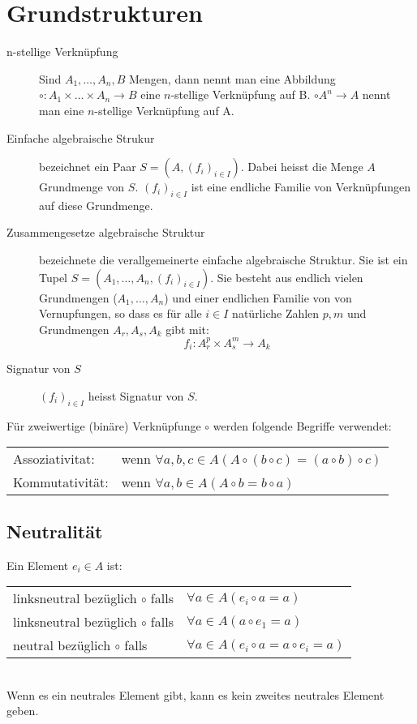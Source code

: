 \section{Grundstrukturen}
\begin{description}
	\item [n-stellige Verknüpfung]
	Sind $A_1, \dots, A_n, B$ Mengen, dann nennt man eine Abbildung $\circ : A_1 \times \dots \times A_n \rightarrow B$
	eine $n$-stellige Verknüpfung auf B. $\circ A^n \rightarrow A$ nennt man eine $n$-stellige Verknüpfung auf A. 
	
	\item[Einfache algebraische Strukur] bezeichnet ein Paar $S = (A, (f_i)_{i \in I})$. Dabei heisst die Menge $A$ Grundmenge von $S$. $(f_i)_{i \in I}$ ist eine endliche Familie von Verknüpfungen auf diese Grundmenge.

	\item [Zusammengesetze algebraische Struktur] bezeichnete die verallgemeinerte einfache algebraische Struktur. Sie ist ein Tupel $S = (A_1, \dots, A_n, (f_i)_{i \in I})$. Sie besteht aus endlich vielen Grundmengen ($A_1, \dots, A_n$) und einer endlichen Familie von von Vernupfungen, so dass es für alle $i \in I$ natürliche Zahlen $p, m$ und Grundmengen $A_r, A_s, A_k$ gibt mit:
		\begin{equation*}
			f_i: A^p_r  \times A^m_s \rightarrow A_k
		\end{equation*}

	\item [Signatur von $S$] $(f_i)_{i \in I}$ heisst Signatur von $S$. 
\end{description}

Für zweiwertige (binäre) Verknüpfunge $\circ$ werden folgende Begriffe verwendet:
\settowidth{\MyLenA}{Kommutativität~~}
\begin{tabular}{@{}p{\the\MyLenA}%
				@{}p{(\linewidth - \the\MyLenA)}}
	Assoziativitat: & wenn $\forall a, b, c \in A (A \circ (b \circ c) = (a \circ b) \circ c)$\\
	Kommutativität: & wenn $\forall a, b \in A (A \circ b = b \circ a)$\\
\end{tabular}

\subsection{Neutralität}
Ein Element $e_i \in A$ ist:
\settowidth{\MyLenA}{linksneutral bezüglich $\circ$ falls~}
\begin{tabular}{@{}p{\the\MyLenA}%
				@{}p{(\linewidth - \the\MyLenA)}}
	linksneutral bezüglich $\circ$ falls & $\forall a \in A (e_i \circ a = a)$\\
	linksneutral bezüglich $\circ$ falls & $\forall a \in A (a \circ e_1 = a)$\\
	neutral bezüglich $\circ$ falls & $\forall a \in A (e_i \circ a = a \circ e_i = a)$\\
\end{tabular}
\\
Wenn es ein neutrales Element gibt, kann es kein zweites neutrales Element geben.


